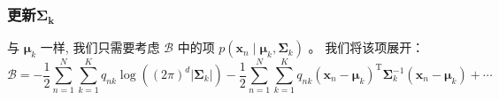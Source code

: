\documentclass[UTF8]{ctexart}
\numberwithin{equation}{section}
\begin{document}
\subsubsection{更新$\boldsymbol{\Sigma_k}$}
与 $\boldsymbol{\mu}_{k}$ 一样, 
我们只需要考虑 $\mathcal{B}$ 中的项 
$p\left(\boldsymbol{x}_{n} \mid \boldsymbol{\mu}_{k}, \boldsymbol{\Sigma}_{k}\right)$ 。
我们将该项展开：
\begin{equation}
    \mathcal{B}=-\frac{1}{2} \sum_{n=1}^{N} \sum_{k=1}^{K} q_{n k} \log \left((2 \pi)^{d}\left|\boldsymbol{\Sigma}_{k}\right|\right)-\frac{1}{2} \sum_{n=1}^{N} \sum_{k=1}^{K} q_{n k}\left(\boldsymbol{x}_{n}-\boldsymbol{\mu}_{k}\right)^{\mathrm{T}} \boldsymbol{\Sigma}_{k}^{-1}\left(\boldsymbol{x}_{n}-\boldsymbol{\mu}_{k}\right)+\cdots 
\end{equation}
\end{document}
